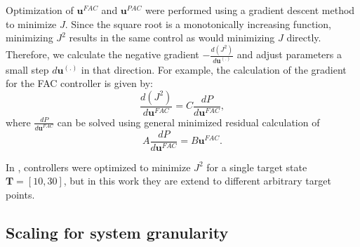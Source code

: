 \documentclass[12pt]{iopart}
\begin{document}
Optimization of $\mathbf{u}^{FAC}$ and $\mathbf{u}^{PAC}$ were performed using a gradient descent method to minimize $J$. Since the square root is a monotonically increasing function, minimizing $J^2$ results in the same control as would minimizing $J$ directly. Therefore, we calculate the negative gradient $-\frac{d(J^2)}{d\mathbf{u}^{(.)}}$ and adjust parameters a small step $d\mathbf{u}^{(.)}$ in that direction. For example, the calculation of the gradient for the FAC controller is given by:
\begin{equation}
\frac{d(J^2)}{d\mathbf{u}^{FAC}}=C \frac{dP}{d\mathbf{u}^{FAC}},
\end{equation}
where $\frac{dP}{d\mathbf{u}^{FAC}}$ can be solved using general minimized residual calculation of
\begin{equation}
A \frac{dP}{d\mathbf{u}^{FAC}}=B \mathbf{u}^{FAC}.
\end{equation}

In \cite{May2021}, controllers were optimized to minimize $J^2$ for a single target state $\mathbf{T} = [10,30]$, but in this work they are extend to different arbitrary target points.


\subsection{Scaling for system granularity}\label{sec:Scaling}
\end{document}
